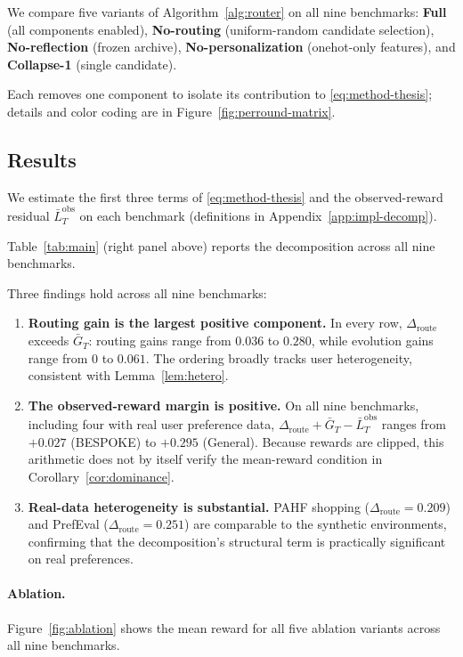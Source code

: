\documentclass{article} %
\begin{document}
We compare five variants of Algorithm~\ref{alg:router} on all nine benchmarks: \textbf{Full} (all components enabled), \textbf{No-routing} (uniform-random candidate selection), \textbf{No-reflection} (frozen archive), \textbf{No-personalization} (onehot-only features), and \textbf{Collapse-1} (single candidate).

Each removes one component to isolate its contribution to \eqref{eq:method-thesis}; details and color coding are in Figure~\ref{fig:perround-matrix}.

\subsection{Results}

\label{sec:exp-results}

We estimate the first three terms of \eqref{eq:method-thesis} and the observed-reward residual \(\bar L_T^{\mathrm{obs}}\) on each benchmark (definitions in Appendix~\ref{app:impl-decomp}).

Table~\ref{tab:main} (right panel above) reports the decomposition across all nine benchmarks.

Three findings hold across all nine benchmarks:

\begin{enumerate}
\item \textbf{Routing gain is the largest positive component.} In every row, $\Delta_{\mathrm{route}}$ exceeds $\bar G_T$: routing gains range from $0.036$ to $0.280$, while evolution gains range from $0$ to $0.061$. The ordering broadly tracks user heterogeneity, consistent with Lemma~\ref{lem:hetero}.
\item \textbf{The observed-reward margin is positive.} On all nine benchmarks, including four with real user preference data, $\Delta_{\mathrm{route}}+\bar G_T-\bar L_T^{\mathrm{obs}}$ ranges from $+0.027$ (BESPOKE) to $+0.295$ (General). Because rewards are clipped, this arithmetic does not by itself verify the mean-reward condition in Corollary~\ref{cor:dominance}.
\item \textbf{Real-data heterogeneity is substantial.} PAHF shopping ($\Delta_{\mathrm{route}}{=}0.209$) and PrefEval ($\Delta_{\mathrm{route}}{=}0.251$) are comparable to the synthetic environments, confirming that the decomposition's structural term is practically significant on real preferences.
\end{enumerate}

\paragraph{Ablation.} Figure~\ref{fig:ablation} shows the mean reward for all five ablation variants across all nine benchmarks.
\end{document}
